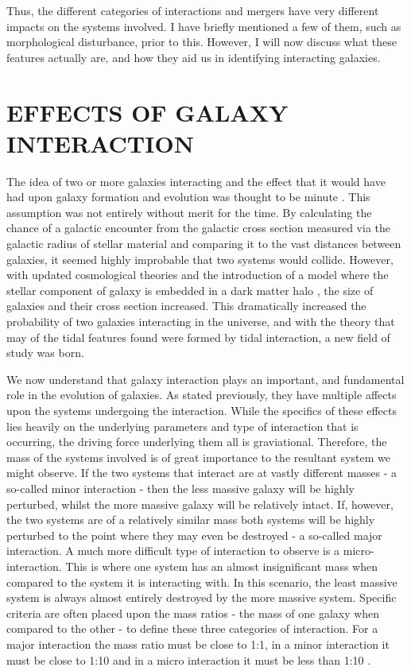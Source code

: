Thus, the different categories of interactions and mergers have very different impacts on the systems involved. I have briefly mentioned a few of them, such as morphological disturbance, prior to this. However, I will now discuss what these features actually are, and how they aid us in identifying interacting galaxies.

\section{EFFECTS OF GALAXY INTERACTION}
The idea of two or more galaxies interacting and the effect that it would have had upon galaxy formation and evolution was thought to be minute \citep{Found this info in Chapter 8 of Binnie and Tremaine. Need to find a better source!}. This assumption was not entirely without merit for the time. By calculating the chance of a galactic encounter from the galactic cross section measured via the galactic radius of stellar material and comparing it to the vast distances between galaxies, it seemed highly improbable that two systems would collide. However, with updated cosmological theories and the introduction of a model where the stellar component of galaxy is embedded in a dark matter halo \citep{Which paper introduced the idea of a galactic halo?}, the size of galaxies and their cross section increased. This dramatically increased the probability of two galaxies interacting in the universe, and with the theory that may of the tidal features found were formed by tidal interaction, a new field of study was born. 

We now understand that galaxy interaction plays an important, and fundamental role in the evolution of galaxies. As stated previously, they have multiple affects upon the systems undergoing the interaction. While the specifics of these effects lies heavily on the underlying parameters and type of interaction that is occurring, the driving force underlying them all is graviational. Therefore, the mass of the systems involved is of great importance to the resultant system we might observe. If the two systems that interact are at vastly different masses - a so-called minor interaction - then the less massive galaxy will be highly perturbed, whilst the more massive galaxy will be relatively intact. If, however, the two systems are of a relatively similar mass both systems will be highly perturbed to the point where they may even be destroyed - a so-called major interaction. A much more difficult type of interaction to observe is a micro-interaction. This is where one system has an almost insignificant mass when compared to the system it is interacting with. In this scenario, the least massive system is always almost entirely destroyed by the more massive system. Specific criteria are often placed upon the mass ratios - the mass of one galaxy when compared to the other - to define these three categories of interaction. For a major interaction the mass ratio must be close to 1:1, in a minor interaction it must be close to 1:10 and in a micro interaction it must be less than 1:10 \citep{A paper that states what the accepted merger ratios are?}. 

